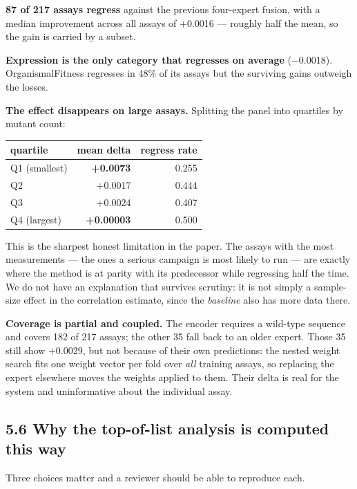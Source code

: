 \textbf{87 of 217 assays regress} against the previous four-expert fusion, with a median improvement across
all assays of +0.0016 --- roughly half the mean, so the gain is carried by a subset.

\textbf{Expression is the only category that regresses on average} (−0.0018). OrganismalFitness regresses in
48\% of its assays but the surviving gains outweigh the losses.

\textbf{The effect disappears on large assays.} Splitting the panel into quartiles by mutant count:

\begin{longtable}[]{@{}lrr@{}}
\toprule
quartile & mean delta & regress rate \\
\midrule
\endhead
Q1 (smallest) & \textbf{+0.0073} & 0.255 \\
Q2 & +0.0017 & 0.444 \\
Q3 & +0.0024 & 0.407 \\
Q4 (largest) & \textbf{+0.00003} & 0.500 \\
\bottomrule
\end{longtable}

This is the sharpest honest limitation in the paper. The assays with the most measurements --- the ones a
serious campaign is most likely to run --- are exactly where the method is at parity with its predecessor
while regressing half the time. We do not have an explanation that survives scrutiny: it is not simply a
sample-size effect in the correlation estimate, since the \emph{baseline} also has more data there.

\textbf{Coverage is partial and coupled.} The encoder requires a wild-type sequence and covers 182 of 217
assays; the other 35 fall back to an older expert. Those 35 still show +0.0029, but not because of their
own predictions: the nested weight search fits one weight vector per fold over \emph{all} training assays, so
replacing the expert elsewhere moves the weights applied to them. Their delta is real for the system and
uninformative about the individual assay.

\hypertarget{why-the-top-of-list-analysis-is-computed-this-way}{%
\subsection{5.6 Why the top-of-list analysis is computed this way}\label{why-the-top-of-list-analysis-is-computed-this-way}}

Three choices matter and a reviewer should be able to reproduce each.


